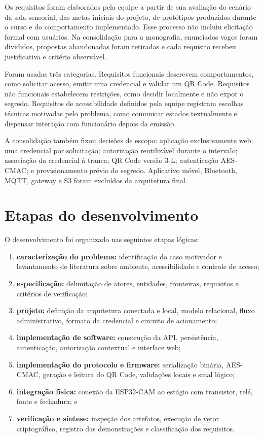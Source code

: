 Os requisitos foram elaborados pela equipe a partir de sua avaliação do cenário da sala sensorial, das metas iniciais do projeto, de protótipos produzidos durante o curso e do comportamento implementado. Esse processo não incluiu elicitação formal com usuários. Na consolidação para a monografia, enunciados vagos foram divididos, propostas abandonadas foram retiradas e cada requisito recebeu justificativa e critério observável.

Foram usadas três categorias. Requisitos funcionais descrevem comportamentos, como solicitar acesso, emitir uma credencial e validar um QR Code. Requisitos não funcionais estabelecem restrições, como decidir localmente e não expor o segredo. Requisitos de acessibilidade definidos pela equipe registram escolhas técnicas motivadas pelo problema, como comunicar estados textualmente e dispensar interação com funcionário depois da emissão.

A consolidação também fixou decisões de escopo: aplicação exclusivamente web; uma credencial por solicitação; autorização reutilizável durante o intervalo; associação da credencial à tranca; QR Code versão 3-L; autenticação AES-CMAC; e provisionamento prévio do segredo. Aplicativo móvel, Bluetooth, MQTT, gateway e S3 foram excluídos da arquitetura final.

\section{Etapas do desenvolvimento}

O desenvolvimento foi organizado nas seguintes etapas lógicas:

\begin{enumerate}
    \item \textbf{caracterização do problema:} identificação do caso motivador e levantamento de literatura sobre ambiente, acessibilidade e controle de acesso;
    \item \textbf{especificação:} delimitação de atores, entidades, fronteiras, requisitos e critérios de verificação;
    \item \textbf{projeto:} definição da arquitetura conectada e local, modelo relacional, fluxo administrativo, formato da credencial e circuito de acionamento;
    \item \textbf{implementação de software:} construção da API, persistência, autenticação, autorização contextual e interface web;
    \item \textbf{implementação do protocolo e firmware:} serialização binária, AES-CMAC, geração e leitura do QR Code, validações locais e sinal lógico;
    \item \textbf{integração física:} conexão da ESP32-CAM ao estágio com transistor, relé, fonte e fechadura; e
    \item \textbf{verificação e síntese:} inspeção dos artefatos, execução de vetor criptográfico, registro das demonstrações e classificação dos requisitos.
\end{enumerate}

